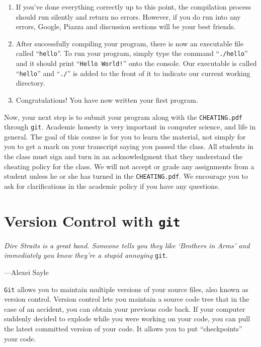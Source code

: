 \documentclass[11pt]{article}
\begin{document}
\begin{enumerate}
	\item If you've done everything correctly up to this point, the compilation
        process should run silently and return no errors. However, if you do run
        into any errors, Google, Piazza and discussion sections will be your best
        friends.

	\item After successfully compiling your program, there is now an
executable file called ``\texttt{hello}''. To run your program, simply type
the command ``\texttt{./hello}'' and it should print ``\texttt{Hello World!}''
onto the console. Our executable is called ``\texttt{hello}'' and ``\texttt{./}'' is added to the front of it to indicate our current working directory.

	\item Congratulations! You have now written your first program.
\end{enumerate}

Now, your next step is to submit your program along with the
\texttt{CHEATING.pdf} through \texttt{git}. Academic honesty is
very important in computer science, and life in general. The
goal of this course is for you to learn the material, not simply
for you to get a mark on your transcript saying you passed the
class. All students in the class must sign and turn in an acknowledgment
that they understand the cheating policy for the class. We will not
accept or grade any assignments from a student unless he or she has
turned in the \texttt{CHEATING.pdf}. We encourage you to ask for
clarifications in the academic policy if you have any questions.

\section{Version Control with {\huge\texttt{git}}}
\epigraph{\emph{Dire Straits is a great band. Someone tells you they like
`Brothers in Arms' and immediately you know they're a stupid annoying}
\texttt{git}.}{---Alexei Sayle}

\noindent \texttt{Git} allows you to maintain multiple versions of your source
files, also known as version control. Version control lets you
maintain a source code tree that in the case of an accident, you
can obtain your previous code back. If your computer suddenly decided
to explode while you were working on your code, you can pull the
latest committed version of your code. It allows you to
put ``checkpoints'' your code.
\end{document}
